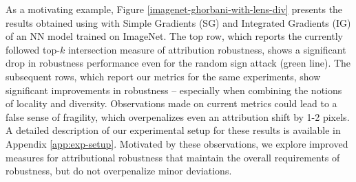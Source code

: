 \documentclass[letterpaper]{article} %
\begin{document}
As a motivating example, Figure \ref{imagenet-ghorbani-with-lens-div} presents the results obtained using \cite{ghorbani2018interpretation} with Simple Gradients (SG) and Integrated Gradients (IG) of an NN model trained on ImageNet. The top row, which reports the currently followed top-$k$ intersection measure of attribution robustness, shows a significant drop in robustness performance even for the random sign attack (green line). The subsequent rows, which report our metrics for the same experiments, show significant improvements in robustness -- especially when combining the notions of locality and diversity. Observations made on current metrics could lead to a false sense of fragility, which overpenalizes even an attribution shift by 1-2 pixels. A detailed description of our experimental setup for these results is available in Appendix \ref{app:exp-setup}. Motivated by these observations, we explore improved measures for attributional robustness that maintain the overall requirements of robustness, but do not overpenalize minor deviations.
%
%
\end{document}
